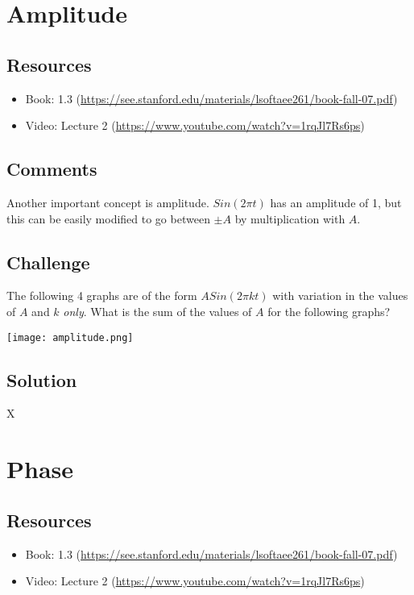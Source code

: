 \section{Amplitude}

\subsection*{Resources}
\begin{itemize}
    \item Book: 1.3 (\url{https://see.stanford.edu/materials/lsoftaee261/book-fall-07.pdf})
    \item Video: Lecture 2 (\url{https://www.youtube.com/watch?v=1rqJl7Rs6ps})
\end{itemize}

\subsection*{Comments}
Another important concept is amplitude. $Sin(2 \pi t)$ has an amplitude of 1, but this can be easily modified to go between $\pm A$ by multiplication with $A$.

\subsection*{Challenge}

The following 4 graphs are of the form $A Sin(2 \pi k t)$ with variation in the values of $A$ and $k$ \emph{only}. What is the sum of the values of $A$ for the following graphs? 

\texttt{[image: amplitude.png]}

\subsection*{Solution}
X


\timebox




\newpage

\section{Phase}

\subsection*{Resources}
\begin{itemize}
    \item Book: 1.3 (\url{https://see.stanford.edu/materials/lsoftaee261/book-fall-07.pdf})
    \item Video: Lecture 2 (\url{https://www.youtube.com/watch?v=1rqJl7Rs6ps})
\end{itemize}

